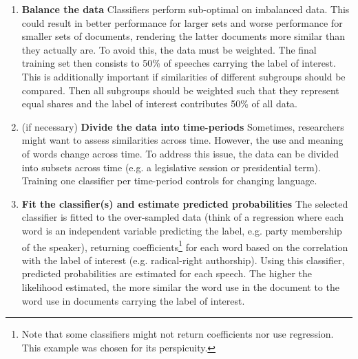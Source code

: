 \documentclass{article}
\begin{document}
\begin{enumerate}
    \item \textbf{Balance the data} \newline Classifiers perform sub-optimal on imbalanced data. This could result in better performance for larger sets and worse performance for smaller sets of documents, rendering the latter documents more similar than they actually are. To avoid this, the data must be weighted. The final training set then consists to 50\% of speeches carrying the label of interest. This is additionally important if similarities of different subgroups should be compared. Then all subgroups should be weighted such that they represent equal shares and the label of interest contributes 50\% of all data.  \par
    \item (if necessary) \textbf{Divide the data into time-periods} \newline Sometimes, researchers might want to assess similarities across time. However, the use and meaning of words change across time. To address this issue, the data can be divided into subsets across time (e.g. a legislative session or presidential term). Training one classifier per time-period controls for changing language.\par
    \item \textbf{Fit the classifier(s) and estimate predicted probabilities} \newline The selected classifier is fitted to the over-sampled data (think of a regression where each word is an independent variable predicting the label, e.g. party membership of the speaker), returning coefficients\footnote{Note that some classifiers might not return coefficients nor use regression. This example was chosen for its perspicuity.} for each word based on the correlation with the label of interest (e.g. radical-right authorship). Using this classifier, predicted probabilities are estimated for each speech. The higher the likelihood estimated, the more similar the word use in the document to the word use in documents carrying the label of interest.\par 
\end{enumerate}
\end{document}
